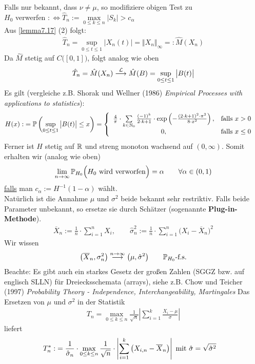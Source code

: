 Falls nur bekannt, dass $\nu\neq\mu$, so modifiziere obigen Test zu\\
$H_0$ verwerfen $:\Longleftrightarrow\hat{T}_n:=\max\limits_{0\leq k\leq n}\big|S_k\big|>c_\alpha$\\
Aus \ref{lemma7.17} (2) folgt:
\begin{align*}
	\hat{T}_n=\sup\limits_{0\leq t\leq 1}\big|X_n(t)\big|=\Vert X_n\Vert_\infty=:\hat{M}(X_n)
\end{align*}
Da $\hat{M}$ stetig auf $C\big([0,1]\big)$, folgt analog wie oben
\begin{align*}
	\hat{T}_n=\hat{M}(X_n)\stackrel{\L}{\longrightarrow}\hat{M}(B)=\sup\limits_{0\leq t\leq 1}\big|B(t)\big|
\end{align*}
Es gilt (vergleiche z.B. Shorak und Wellner (1986) \textit{Empirical Processes with applications to statistics}):
\begin{align*}
	H(x):&=\P\left(\sup\limits_{0\leq t\leq 1}\big|B(t)\big|\leq x\right)
	=\left\lbrace\begin{array}{cl}
		\frac{4}{\pi}\cdot\sum\limits_{k\in\N_0}\frac{(-1)^k}{2\cdot k+1}\cdot\exp\left(-\frac{(2\cdot k+1)^2\cdot\pi^2}{8\cdot x^2}\right), &\falls x>0\\
		0, &\falls x\leq 0
	\end{array}\right.
\end{align*}
Ferner ist $H$ stetig auf $\R$ und streng monoton wachsend auf $(0,\infty)$. Somit erhalten wir (analog wie oben)
\begin{align*}
	\limn\P_{H_0}\Big(H_0\text{ wird verworfen}\Big)=\alpha\qquad\forall\alpha\in(0,1)
\end{align*}
\ul{falls} man $c_\alpha:=H^{-1}(1-\alpha)$ wählt.\\
Natürlich ist die Annahme $\mu$ und $\sigma^2$ beide bekannt sehr restriktiv. 
Falls beide Parameter unbekannt, so ersetze sie durch Schätzer (sogenannte \textbf{Plug-in-Methode}).
\begin{align*}
	\overline{X}_n:=\frac{1}{n}\cdot\sum\limits_{i=1}^n X_i,\qquad 
	\hat{\sigma}_n^2:=\frac{1}{n}\cdot\sum\limits_{i=1}^n\big(X_i-\overline{X}_n\big)^2
\end{align*}
Wir wissen
\begin{align*}
	\big(\overline{X}_n,\sigma_n^2\big)\stackrel{n\to\infty}{\longrightarrow}\big(\mu,\hat{\sigma}^2\big)\qquad\P_{H_0}\text{-f.s.}
\end{align*}
Beachte: Es gibt auch ein starkes Gesetz der großen Zahlen (SGGZ bzw. auf englisch SLLN) für Dreiecksschemata (arrays), 
siehe z.B. Chow und Teicher (1997) \textit{Probability Theory - Independence, Interchangeability, Martingales}\nl
Das Ersetzen von $\mu$ und $\sigma^2$ in der Statistik
\begin{align*}
	T_n=\max\limits_{0\leq k\leq n}\frac{1}{\sqrt{n}}\left|\sum\limits_{i=1}^k\frac{X_i-\mu}{\sigma}\right|
\end{align*}
liefert
\begin{align*}
	T_n^\ast
	:&=\frac{1}{\hat{\sigma}_n}\cdot\max\limits_{0\leq k\leq n}\frac{1}{\sqrt{n}}\cdot\left|\sum\limits_{i=1}^k \big(X_{i,n}-\overline{X}_n\big)\right|
	\mit \hat{\sigma}=\sqrt{\hat{\sigma}^2}
\end{align*}

